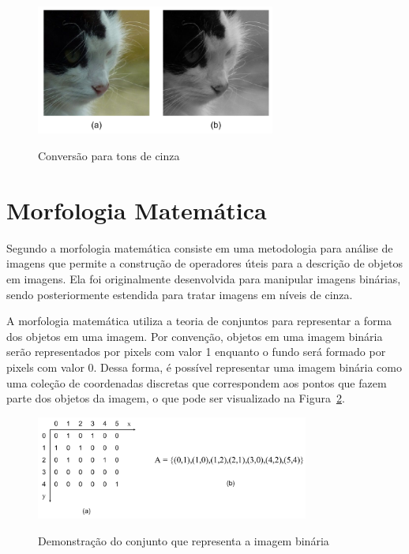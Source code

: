 \documentclass[12pt,oneside,a4paper,english,french,spanish,brazil,]{abntex2}
\begin{document}
\begin{figure}[ht]
\centering
\caption{Conversão para tons de cinza}
\includegraphics[width=0.7\textwidth]{imagens/PDI_Gray.pdf}
\sourceAuthor
\label{fig:PDI_Gray}
\end{figure}

\section{Morfologia Matemática}

Segundo \citet{pedrini:2008} a morfologia matemática consiste em uma metodologia para análise de imagens que permite a construção de operadores úteis para a descrição de objetos em imagens. Ela foi originalmente desenvolvida para manipular imagens binárias, sendo posteriormente estendida para tratar imagens em níveis de cinza.

A morfologia matemática utiliza a teoria de conjuntos para representar a forma dos objetos em uma imagem. Por convenção, objetos em uma imagem binária serão representados por pixels com valor 1 enquanto o fundo será formado por pixels com valor 0. Dessa forma, é possível representar uma imagem binária como uma coleção de coordenadas discretas que correspondem aos pontos que fazem parte dos objetos da imagem, o que pode ser visualizado na Figura~\ref{fig:PDI_Conjunto}.

\begin{figure}[ht]
\centering
\caption{Demonstração do conjunto que representa a imagem binária}
\includegraphics[width=0.8\textwidth]{imagens/PDI_Conjunto.pdf}
\label{fig:PDI_Conjunto}
\end{figure}
\end{document}
